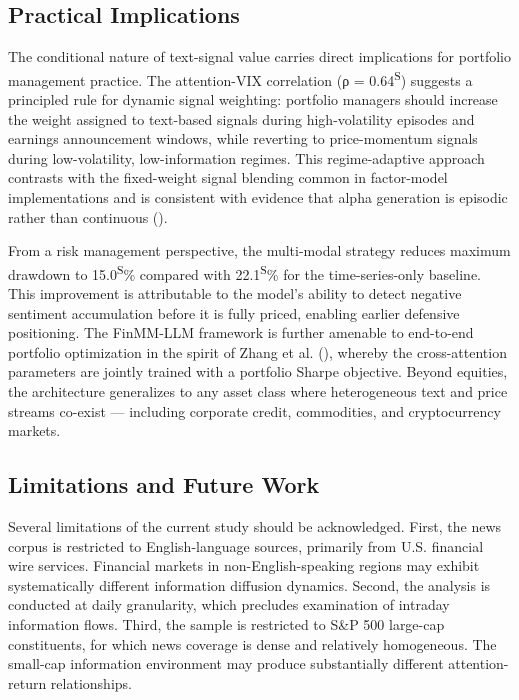 \documentclass[
  11pt,
  a4paper,
]{article}
\begin{document}
\subsection{Practical Implications}\label{practical-implications}

The conditional nature of text-signal value carries direct implications
for portfolio management practice. The attention-VIX correlation (ρ =
0.64\textsuperscript{S}) suggests a principled rule for dynamic signal
weighting: portfolio managers should increase the weight assigned to
text-based signals during high-volatility episodes and earnings
announcement windows, while reverting to price-momentum signals during
low-volatility, low-information regimes. This regime-adaptive approach
contrasts with the fixed-weight signal blending common in factor-model
implementations and is consistent with evidence that alpha generation is
episodic rather than continuous ().

From a risk management perspective, the multi-modal strategy reduces
maximum drawdown to 15.0\textsuperscript{S}\% compared with
22.1\textsuperscript{S}\% for the time-series-only baseline. This
improvement is attributable to the model's ability to detect negative
sentiment accumulation before it is fully priced, enabling earlier
defensive positioning. The FinMM-LLM framework is further amenable to
end-to-end portfolio optimization in the spirit of Zhang et al.
(), whereby the cross-attention
parameters are jointly trained with a portfolio Sharpe objective. Beyond
equities, the architecture generalizes to any asset class where
heterogeneous text and price streams co-exist --- including corporate
credit, commodities, and cryptocurrency markets.

\subsection{Limitations and Future
Work}\label{limitations-and-future-work}

Several limitations of the current study should be acknowledged. First,
the news corpus is restricted to English-language sources, primarily
from U.S. financial wire services. Financial markets in
non-English-speaking regions may exhibit systematically different
information diffusion dynamics. Second, the analysis is conducted at
daily granularity, which precludes examination of intraday information
flows. Third, the sample is restricted to S\&P 500 large-cap
constituents, for which news coverage is dense and relatively
homogeneous. The small-cap information environment may produce
substantially different attention-return relationships.
\end{document}
